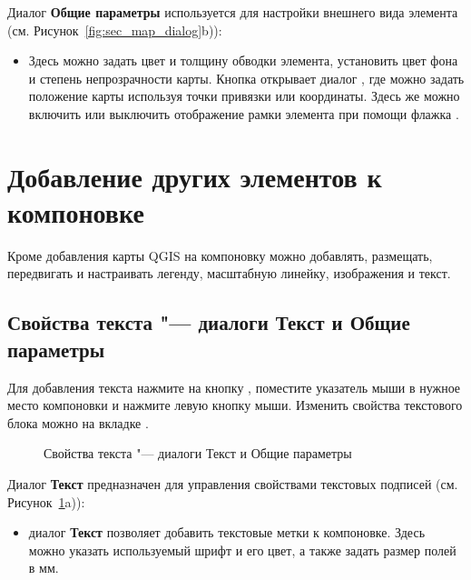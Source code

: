 
Диалог \textbf{Общие параметры} используется для настройки внешнего
вида элемента (см. Рисунок~\ref{fig:sec_map_dialog}b)):

\begin{itemize}[label=--]
\item Здесь можно задать цвет и толщину обводки элемента, установить цвет
фона и степень непрозрачности карты. Кнопка  открывает
диалог , где можно задать положение карты
используя точки привязки или координаты. Здесь же можно включить или
выключить отображение рамки элемента при помощи флажка
.
\end{itemize}

\section{Добавление других элементов к компоновке}

Кроме добавления карты QGIS на компоновку можно добавлять, размещать,
передвигать и настраивать легенду, масштабную линейку, изображения и
текст.

\subsection{Свойства текста "--- диалоги Текст и Общие параметры}

Для добавления текста нажмите на кнопку
, поместите указатель мыши в
нужное место компоновки и нажмите левую кнопку мыши. Изменить свойства
текстового блока можно на вкладке .

\begin{figure}[ht]
\centering
   \hspace{1cm}
   \caption{Свойства текста "--- диалоги Текст и Общие параметры \nixcaption}\label{fig:label_option}
\end{figure}


Диалог \textbf{Текст} предназначен для управления свойствами текстовых
подписей (см. Рисунок~\ref{fig:label_option}a)):

\begin{itemize}[label=--]
\item диалог \textbf{Текст} позволяет добавить текстовые метки к
компоновке. Здесь можно указать используемый шрифт и его цвет, а также
задать размер полей в мм.
\end{itemize}

